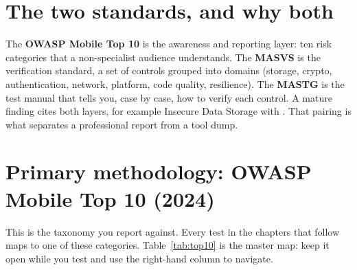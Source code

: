 \section*{The two standards, and why both}
The \textbf{OWASP Mobile Top 10} is the awareness and reporting layer: ten risk categories that a non-specialist audience understands. The \textbf{MASVS} is the verification standard, a set of controls grouped into domains (storage, crypto, authentication, network, platform, code quality, resilience). The \textbf{MASTG} is the test manual that tells you, case by case, how to verify each control. A mature finding cites both layers, for example  Insecure Data Storage with . That pairing is what separates a professional report from a tool dump.

\section*{Primary methodology: OWASP Mobile Top 10 (2024)}
This is the taxonomy you report against. Every test in the chapters that follow maps to one of these categories. Table~\ref{tab:top10} is the master map: keep it open while you test and use the right-hand column to navigate.

